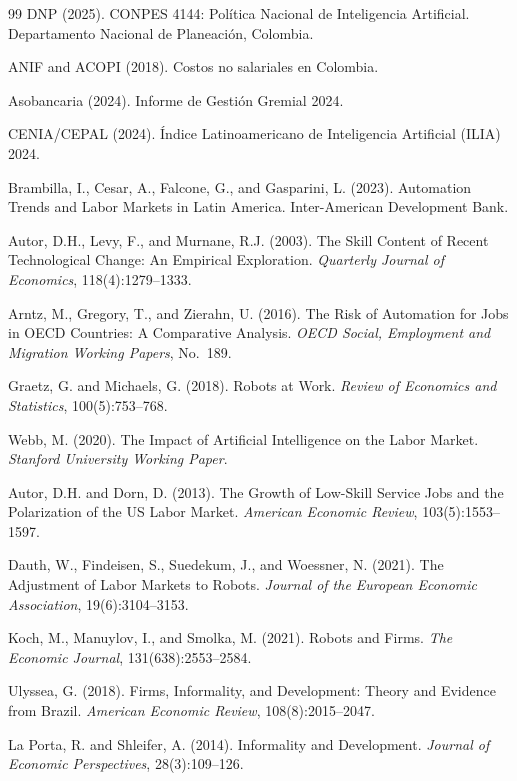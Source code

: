 \documentclass{article}
\begin{document}
\begin{thebibliography}{99}
DNP (2025).
\newblock CONPES 4144: Pol\'itica Nacional de Inteligencia Artificial.
\newblock Departamento Nacional de Planeaci\'on, Colombia.

ANIF and ACOPI (2018).
\newblock Costos no salariales en Colombia.

Asobancaria (2024).
\newblock Informe de Gesti\'on Gremial 2024.

CENIA/CEPAL (2024).
\newblock \'Indice Latinoamericano de Inteligencia Artificial (ILIA) 2024.

Brambilla, I., Cesar, A., Falcone, G., and Gasparini, L. (2023).
\newblock Automation Trends and Labor Markets in Latin America.
\newblock Inter-American Development Bank.

Autor, D.H., Levy, F., and Murnane, R.J. (2003). The Skill Content of Recent Technological Change: An Empirical Exploration. \textit{Quarterly Journal of Economics}, 118(4):1279--1333.

Arntz, M., Gregory, T., and Zierahn, U. (2016). The Risk of Automation for Jobs in OECD Countries: A Comparative Analysis. \textit{OECD Social, Employment and Migration Working Papers}, No.~189.

Graetz, G. and Michaels, G. (2018). Robots at Work. \textit{Review of Economics and Statistics}, 100(5):753--768.

Webb, M. (2020). The Impact of Artificial Intelligence on the Labor Market. \textit{Stanford University Working Paper}.

Autor, D.H. and Dorn, D. (2013). The Growth of Low-Skill Service Jobs and the Polarization of the US Labor Market. \textit{American Economic Review}, 103(5):1553--1597.

Dauth, W., Findeisen, S., Suedekum, J., and Woessner, N. (2021). The Adjustment of Labor Markets to Robots. \textit{Journal of the European Economic Association}, 19(6):3104--3153.

Koch, M., Manuylov, I., and Smolka, M. (2021). Robots and Firms. \textit{The Economic Journal}, 131(638):2553--2584.

Ulyssea, G. (2018). Firms, Informality, and Development: Theory and Evidence from Brazil. \textit{American Economic Review}, 108(8):2015--2047.

La Porta, R. and Shleifer, A. (2014). Informality and Development. \textit{Journal of Economic Perspectives}, 28(3):109--126.


\end{thebibliography}
\end{document}
